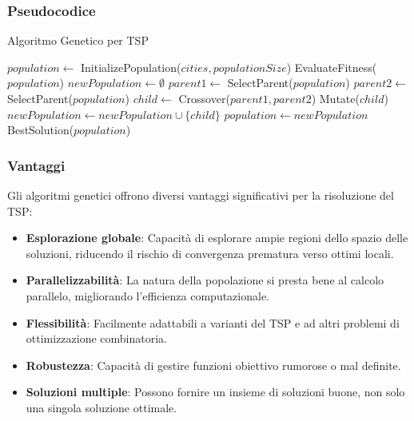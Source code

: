 \subsubsection{Pseudocodice}


\begin{algorithm}
	\caption{Algoritmo Genetico per \Gls{TSP}}\label{alg:geneticalgorithm}
	\begin{algorithmic}[1]
		\State $population \gets$ InitializePopulation($cities, populationSize$)
		\State EvaluateFitness($population$)
		\State $newPopulation \gets \emptyset$
		\State $parent1 \gets$ SelectParent($population$)
		\State $parent2 \gets$ SelectParent($population$)
		\State $child \gets$ Crossover($parent1, parent2$)
		\State Mutate($child$)
		\EndIf
		\State $newPopulation \gets newPopulation \cup \{child\}$
		\EndWhile
		\State $population \gets newPopulation$
		\EndFor
		\State \Return BestSolution($population$)
		\EndProcedure
	\end{algorithmic}
\end{algorithm}

\subsubsection{Vantaggi}

Gli algoritmi genetici offrono diversi vantaggi significativi per la risoluzione del \Gls{TSP}:

\begin{itemize}
	\item \textbf{Esplorazione globale}: Capacità di esplorare ampie regioni dello spazio delle soluzioni, riducendo il rischio di convergenza prematura verso ottimi locali.
	\item \textbf{Parallelizzabilità}: La natura della popolazione si presta bene al calcolo parallelo, migliorando l'efficienza computazionale.
	\item \textbf{Flessibilità}: Facilmente adattabili a varianti del \Gls{TSP} e ad altri problemi di ottimizzazione combinatoria.
	\item \textbf{Robustezza}: Capacità di gestire funzioni obiettivo rumorose o mal definite.
	\item \textbf{Soluzioni multiple}: Possono fornire un insieme di soluzioni buone, non solo una singola soluzione ottimale.
\end{itemize}

